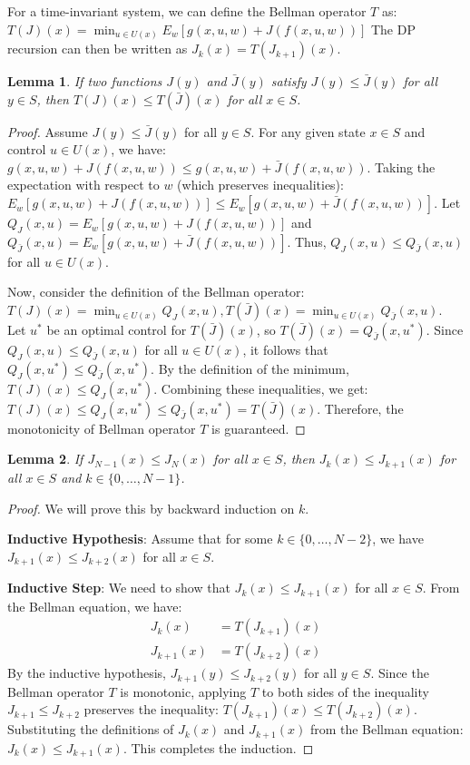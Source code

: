 \documentclass[11pt, a4paper, oneside]{memoir}
\newtheorem{lemma}{Lemma}
\begin{document}
For a time-invariant system, we can define the Bellman operator $T$ as:
$T(J)(x) = \min_{u \in U(x)} E_w[g(x, u, w) + J(f(x, u, w))]$
The DP recursion can then be written as $J_k(x) = T(J_{k+1})(x)$.

\begin{lemma}
  If two functions $J(y)$ and $\bar{J}(y)$ satisfy $J(y) \le \bar{J}(y)$ for all $y \in S$, then $T(J)(x) \le T(\bar{J})(x)$ for all $x \in S$.
\end{lemma}

\begin{proof}
  Assume $J(y) \le \bar{J}(y)$ for all $y \in S$.
  For any given state $x \in S$ and control $u \in U(x)$, we have:
  $g(x, u, w) + J(f(x, u, w)) \le g(x, u, w) + \bar{J}(f(x, u, w))$.
  Taking the expectation with respect to $w$ (which preserves inequalities):
  $E_w[g(x, u, w) + J(f(x, u, w))] \le E_w[g(x, u, w) + \bar{J}(f(x, u, w))]$.
  Let $Q_J(x, u) = E_w[g(x, u, w) + J(f(x, u, w))]$ and $Q_{\bar{J}}(x, u) = E_w[g(x, u, w) + \bar{J}(f(x, u, w))]$.
  Thus, $Q_J(x, u) \le Q_{\bar{J}}(x, u)$ for all $u \in U(x)$.

  Now, consider the definition of the Bellman operator:
  $T(J)(x) = \min_{u \in U(x)} Q_J(x, u),T(\bar{J})(x) = \min_{u \in U(x)} Q_{\bar{J}}(x, u)$.
  Let $u^*$ be an optimal control for $T(\bar{J})(x)$, so $T(\bar{J})(x) = Q_{\bar{J}}(x, u^*)$.
  Since $Q_J(x, u) \le Q_{\bar{J}}(x, u)$ for all $u \in U(x)$, it follows that $Q_J(x, u^*) \le Q_{\bar{J}}(x, u^*)$.
  By the definition of the minimum, $T(J)(x) \le Q_J(x, u^*)$.
  Combining these inequalities, we get:
  $T(J)(x) \le Q_J(x, u^*) \le Q_{\bar{J}}(x, u^*) = T(\bar{J})(x)$.
  Therefore, the monotonicity of Bellman operator $T$ is guaranteed.
\end{proof}

\begin{lemma}
If $J_{N-1}(x) \le J_N(x)$ for all $x \in S$, then $J_k(x) \le J_{k+1}(x)$ for all $x \in S$ and $k \in \{0, \dots, N-1\}$.
\end{lemma}

\begin{proof}
  We will prove this by backward induction on $k$.

  \textbf{Inductive Hypothesis}:
  Assume that for some $k \in \{0, \dots, N-2\}$, we have $J_{k+1}(x) \le J_{k+2}(x)$ for all $x \in S$.

  \textbf{Inductive Step}:
  We need to show that $J_k(x) \le J_{k+1}(x)$ for all $x \in S$.
  From the Bellman equation, we have:
  \begin{align*}
    J_k(x) &= T(J_{k+1})(x) \\
    J_{k+1}(x) &= T(J_{k+2})(x)
  \end{align*}
  By the inductive hypothesis, $J_{k+1}(y) \le J_{k+2}(y)$ for all $y \in S$.
  Since the Bellman operator $T$ is monotonic, applying $T$ to both sides of the inequality $J_{k+1} \le J_{k+2}$ preserves the inequality:
  $T(J_{k+1})(x) \le T(J_{k+2})(x)$.
  Substituting the definitions of $J_k(x)$ and $J_{k+1}(x)$ from the Bellman equation:
  $J_k(x) \le J_{k+1}(x)$.
  This completes the induction.
\end{proof}
\end{document}
